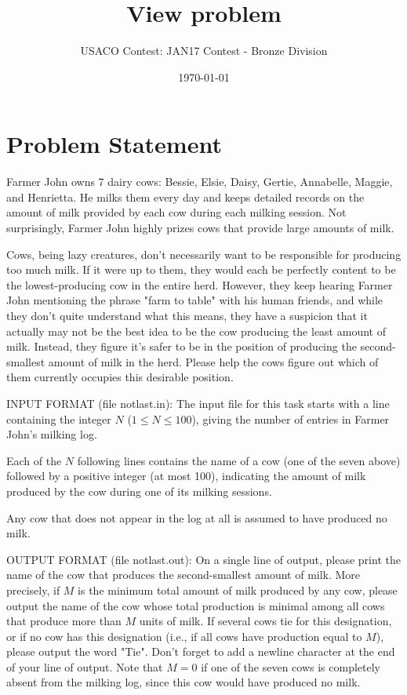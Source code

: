\documentclass[12pt]{article}
\title{View problem}
\author{USACO Contest: JAN17 Contest - Bronze Division}
\date{\today}
\begin{document}
\maketitle

\section*{Problem Statement}

Farmer John owns 7 dairy cows: Bessie, Elsie, Daisy, Gertie, Annabelle, Maggie,
and Henrietta. He milks them every day and keeps detailed records on the amount
of milk provided by each cow during each milking session.  Not surprisingly,
Farmer John highly prizes cows that provide large amounts of milk.

Cows, being lazy creatures, don't necessarily want to be responsible for
producing too much milk.  If it were up to them, they would each be perfectly
content to be the lowest-producing cow in the entire herd.  However, they keep
hearing Farmer John mentioning the phrase "farm to table" with his human
friends, and while they don't quite understand what this means, they have a
suspicion that it actually may not be the best idea to be the cow producing the
least amount of milk.  Instead, they figure it's safer to be in the position of
producing the second-smallest amount of milk in the herd.  Please help the cows
figure out which of them currently occupies this desirable position.

INPUT FORMAT (file notlast.in):
The input file for this task starts with a line containing the integer $N$
($1 \leq N \leq 100$), giving the number of entries in Farmer John's milking
log.  

Each of the $N$ following lines contains the name of a cow (one of the seven
above) followed by a positive integer (at most 100), indicating the amount of
milk produced by the cow during one of its milking sessions.  

Any cow that does not appear in the log at all is assumed to have produced no
milk.

OUTPUT FORMAT (file notlast.out):
On a single line of output, please print the name of the cow that produces the 
second-smallest amount of milk.  More precisely, if $M$ is the minimum total
amount of milk produced by any cow, please output the name of the cow whose
total production is minimal among all cows that produce more than $M$ units of
milk.  If several cows tie for this designation, or if no cow has this
designation (i.e., if all cows have production equal to $M$), please output the
word "Tie". Don't forget to add a newline character at the end of your line of
output. Note that $M=0$ if one of the seven cows is completely absent from the
milking log, since this cow would have produced no milk.
\end{document}
